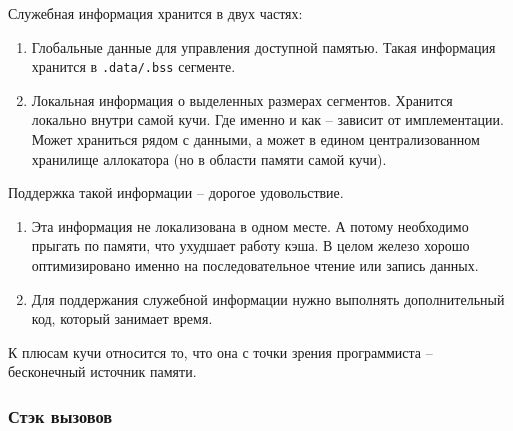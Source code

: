 \documentclass{article}
\begin{document}
Служебная информация хранится в двух частях:
\begin{enumerate}
\item Глобальные данные для управления доступной памятью.
Такая информация хранится в \verb".data/.bss" сегменте.

\item Локальная информация о выделенных размерах сегментов.
Хранится локально внутри самой кучи.
Где именно и как -- зависит от имплементации.
Может храниться рядом с данными, а может в едином централизованном хранилище аллокатора (но в области памяти самой кучи).
\end{enumerate}
Поддержка такой информации -- дорогое удовольствие.
\begin{enumerate}
\item Эта информация не локализована в одном месте.
А потому необходимо прыгать по памяти, что ухудшает работу кэша.
В целом железо хорошо оптимизировано именно на последовательное чтение или запись данных.

\item Для поддержания служебной информации нужно выполнять дополнительный код, который занимает время.
\end{enumerate}
К плюсам кучи относится то, что она с точки зрения программиста -- бесконечный источник памяти.

\subsubsection{Стэк вызовов}
\end{document}
